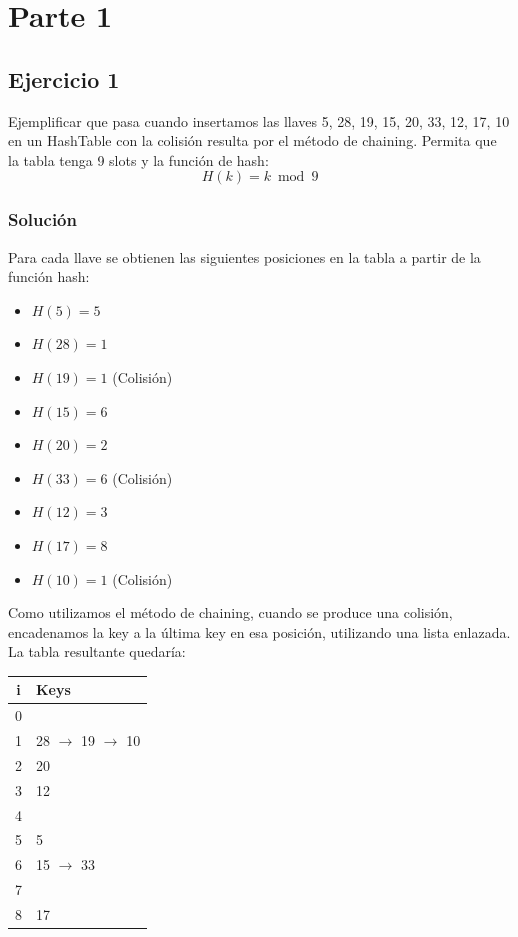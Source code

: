 \documentclass{article}
\begin{document}


\section*{Parte 1}
\subsection*{Ejercicio 1}
Ejemplificar que pasa cuando insertamos las llaves 5, 28, 19, 15, 20, 33, 12, 17, 10 en un HashTable con la colisión resulta por el método de chaining. Permita que la tabla tenga 9 slots y la función de hash:
\begin{equation}
    H(k) = k \bmod 9
\end{equation}
\subsubsection*{Solución}
Para cada llave se obtienen las siguientes posiciones en la tabla a partir de la función hash:
\begin{itemize}
    \item $H(5) = 5$
    \item $H(28) = 1$
    \item $H(19) = 1$ (Colisión)
    \item $H(15) = 6$
    \item $H(20) = 2$
    \item $H(33) = 6$ (Colisión)
    \item $H(12) = 3$
    \item $H(17) = 8$
    \item $H(10) = 1$ (Colisión)
\end{itemize}
Como utilizamos el método de chaining, cuando se produce una colisión, encadenamos la key a la última key en esa posición, utilizando una lista enlazada. La tabla resultante quedaría:

\begin{tabular}{|c|l|}
    \hline
    i & Keys \\ \hline
    0 &      \\ \hline
    1 & 28 $\rightarrow$ 19 $\rightarrow$ 10 \\ \hline
    2 & 20   \\ \hline
    3 & 12   \\ \hline
    4 &      \\ \hline
    5 & 5    \\ \hline
    6 & 15 $\rightarrow$ 33 \\ \hline
    7 &      \\ \hline
    8 & 17   \\ \hline
\end{tabular}
\end{document}
